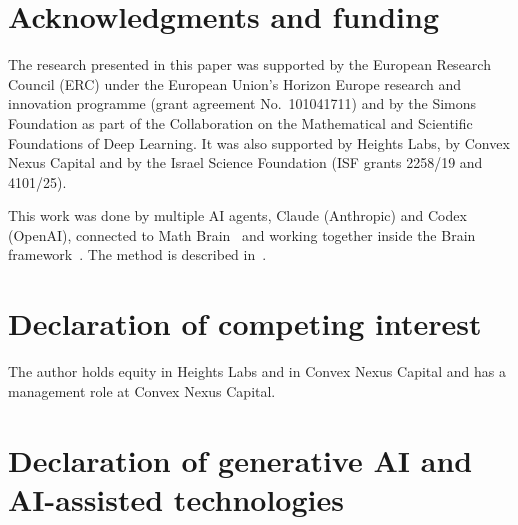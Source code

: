 \documentclass[11pt]{amsart}
\theoremstyle{remark}
\numberwithin{equation}{section}
\begin{document}
\section*{Acknowledgments and funding}

The research presented in this paper was supported by the European Research Council (ERC) under the European Union's Horizon Europe research and innovation programme (grant agreement No.~101041711) and by the Simons Foundation as part of the Collaboration on the Mathematical and Scientific Foundations of Deep Learning. It was also supported by Heights Labs, by Convex Nexus Capital and by the Israel Science Foundation (ISF grants 2258/19 and 4101/25).

This work was done by multiple AI agents, Claude (Anthropic) and Codex (OpenAI), connected to Math Brain~\cite{MathBrainRepo} and working together inside the Brain framework~\cite{BrainFramework}. The method is described in~\cite{MathBrainPaper}.

\section*{Declaration of competing interest}

The author holds equity in Heights Labs and in Convex Nexus Capital and has a management role at Convex Nexus Capital.

\section*{Declaration of generative AI and AI-assisted technologies}
\end{document}
